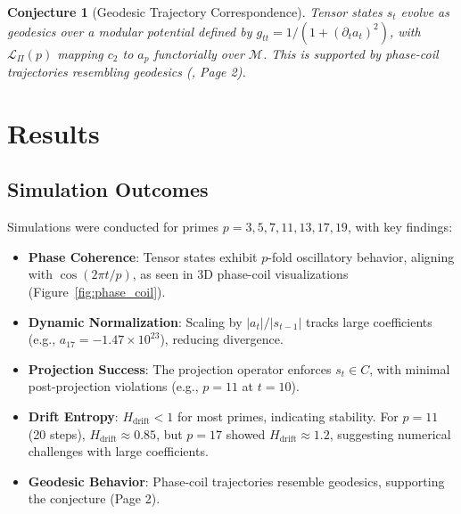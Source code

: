 \documentclass[11pt]{article}
\newtheorem{conjecture}{Conjecture}
\newcommand{\BraidOp}{\mathcal{L}_\Pi(p)}
\newcommand{\ModSpace}{\mathcal{M}}
\newcommand{\Entropy}{H_{\text{drift}}}
\begin{document}
\begin{conjecture}[Geodesic Trajectory Correspondence]
Tensor states \( s_t \) evolve as geodesics over a modular potential defined by \( g_{tt} = 1 / (1 + (\partial_t a_t)^2) \), with \( \BraidOp \) mapping \( c_2 \) to \( a_p \) functorially over \( \ModSpace \). This is supported by phase-coil trajectories resembling geodesics (\cite{PrimeAdvancements9}, Page 2).
\end{conjecture}

\section{Results}
\subsection{Simulation Outcomes}
Simulations were conducted for primes \( p = 3, 5, 7, 11, 13, 17, 19 \), with key findings:

\begin{itemize}
    \item \textbf{Phase Coherence}: Tensor states exhibit \( p \)-fold oscillatory behavior, aligning with \( \cos(2\pi t/p) \), as seen in 3D phase-coil visualizations (Figure~\ref{fig:phase_coil}).
    \item \textbf{Dynamic Normalization}: Scaling by \( |a_t| / |s_{t-1}| \) tracks large coefficients (e.g., \( a_{17} = -1.47 \times 10^{23} \)), reducing divergence.
    \item \textbf{Projection Success}: The projection operator enforces \( s_t \in C \), with minimal post-projection violations (e.g., \( p = 11 \) at \( t = 10 \)).
    \item \textbf{Drift Entropy}: \( \Entropy < 1 \) for most primes, indicating stability. For \( p = 11 \) (20 steps), \( \Entropy \approx 0.85 \), but \( p = 17 \) showed \( \Entropy \approx 1.2 \), suggesting numerical challenges with large coefficients.
    \item \textbf{Geodesic Behavior}: Phase-coil trajectories resemble geodesics, supporting the conjecture (Page 2).
\end{itemize}
\end{document}
